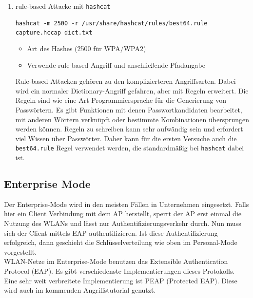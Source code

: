 \begin{enumerate}
	\item rule-based Attacke mit \colorbox{altgray}{\lstinline|hashcat|}

	\colorbox{altgray}{\lstinline|hashcat -m 2500 -r /usr/share/hashcat/rules/best64.rule capture.hccap dict.txt|}\newline
	\begin{itemize}
		\item {} Art des Hashes (2500 für WPA/WPA2)\newline
		\item {} Verwende rule-based Angriff und anschließende Pfadangabe\newline
    \end{itemize}
	Rule-based Attacken gehören zu den komplizierteren Angriffsarten. Dabei wird ein normaler Dictionary-Angriff gefahren, aber mit Regeln erweitert. Die Regeln sind wie eine Art Programmiersprache für die Generierung von Passwörtern. Es gibt Funktionen mit denen Passwortkandidaten bearbeitet, mit anderen Wörtern verknüpft oder bestimmte Kombinationen übersprungen werden können. Regeln zu schreiben kann sehr aufwändig sein und erfordert viel Wissen über Passwörter. Daher kann für die ersten Versuche auch die \colorbox{altgray}{\lstinline|best64.rule|} Regel verwendet werden, die standardmäßig bei \colorbox{altgray}{\lstinline|hashcat|} dabei ist.\newline
\end{enumerate}

\subsection{Enterprise Mode}
Der Enterprise-Mode wird in den meisten Fällen in Unternehmen eingesetzt. Falls hier ein Client Verbindung mit dem AP herstellt, sperrt der AP erst einmal die Nutzung des WLANs und lässt nur Authentifizierungsverkehr durch. Nun muss sich der Client mittels EAP authentifizieren. Ist diese Authentifizierung erfolgreich, dann geschieht die Schlüsselverteilung wie oben im Personal-Mode vorgestellt.\\
WLAN-Netze im Enterprise-Mode benutzen das Extensible Authentication Protocol (EAP). Es gibt verschiedenste Implementierungen dieses Protokolls. Eine sehr weit verbreitete Implementierung ist PEAP (Protected EAP). Diese wird auch im kommenden Angriffstutorial genutzt.

